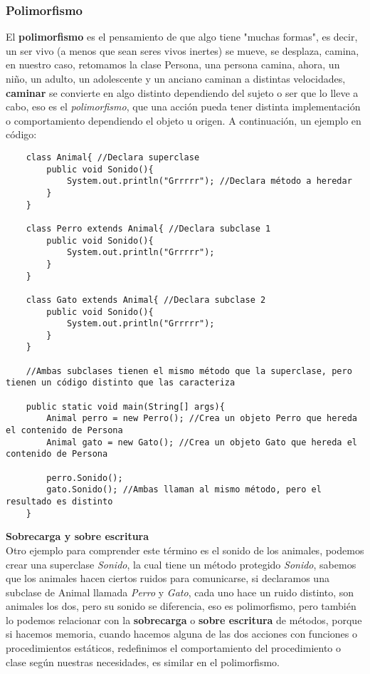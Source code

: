 \subsubsection{Polimorfismo}
El \textbf{polimorfismo} es el pensamiento de que algo tiene "muchas formas", es decir, un ser vivo (a menos que sean seres vivos inertes) se mueve, se desplaza, camina, en nuestro caso, retomamos la clase Persona, una persona camina, ahora, un niño, un adulto, un adolescente y un anciano caminan a distintas velocidades, \textbf{caminar} se convierte en algo distinto dependiendo del sujeto o ser que lo lleve a cabo, eso es el \textit{polimorfismo}, que una acción pueda tener distinta implementación o comportamiento dependiendo el objeto u origen.
A continuación, un ejemplo en código:
\begin{lstlisting}
    class Animal{ //Declara superclase
        public void Sonido(){
            System.out.println("Grrrrr"); //Declara método a heredar
        }
    }
    
    class Perro extends Animal{ //Declara subclase 1
        public void Sonido(){
            System.out.println("Grrrrr");
        }
    }
    
    class Gato extends Animal{ //Declara subclase 2
        public void Sonido(){
            System.out.println("Grrrrr");
        }
    }
    
    //Ambas subclases tienen el mismo método que la superclase, pero tienen un código distinto que las caracteriza
    
    public static void main(String[] args){
        Animal perro = new Perro(); //Crea un objeto Perro que hereda el contenido de Persona
        Animal gato = new Gato(); //Crea un objeto Gato que hereda el contenido de Persona
        
        perro.Sonido();
        gato.Sonido(); //Ambas llaman al mismo método, pero el resultado es distinto
    }
\end{lstlisting}
\textbf{Sobrecarga y sobre escritura}\\
Otro ejemplo para comprender este término es el sonido de los animales, podemos crear una superclase \textit{Sonido}, la cual tiene un método protegido \textit{Sonido}, sabemos que los animales hacen ciertos ruidos para comunicarse, si declaramos una subclase de Animal llamada \textit{Perro} y \textit{Gato}, cada uno hace un ruido distinto, son animales los dos, pero su sonido se diferencia, eso es polimorfismo, pero también lo podemos relacionar con la \textbf{sobrecarga} o \textbf{sobre escritura} de métodos, porque si hacemos memoria, cuando hacemos alguna de las dos acciones con funciones o procedimientos estáticos, redefinimos el comportamiento del procedimiento o clase según nuestras necesidades, es similar en el polimorfismo.\\
